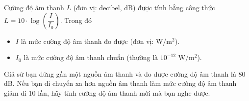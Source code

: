 \begin{bt}%

	Cường độ âm thanh $L$ (đơn vị: decibel, dB) được tính bằng công thức \break $L=10\cdot\log\left(\dfrac{I}{I_0}\right)$.	Trong đó
	\begin{itemize}
		\item $I$ là mức cường độ âm thanh đo được (đơn vị: W/m$^2$).
		\item $I_0$ là mức cường độ âm thanh chuẩn (thường là $10^{-12}$ W/m$^2$).
	\end{itemize}
	Giả sử bạn đứng gần một nguồn âm thanh và đo được cường độ âm thanh là $80$ dB. Nếu bạn di chuyển xa hơn nguồn âm thanh làm mức cường độ âm thanh giảm đi $10$ lần, hãy tính cường độ âm thanh mới mà bạn nghe được.
\end{bt}

